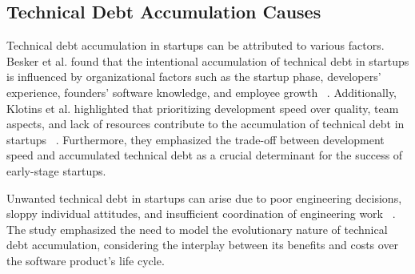 
\subsection{Technical Debt Accumulation Causes}
Technical debt accumulation in startups can be attributed to various factors. Besker et al. found that the intentional accumulation of technical debt in startups is influenced by organizational factors such as the startup phase, developers' experience, founders' software knowledge, and employee growth ~\cite{Besker2018}. Additionally, Klotins et al. highlighted that prioritizing development speed over quality, team aspects, and lack of resources contribute to the accumulation of technical debt in startups ~\cite{Klotins:2018:ETD}. Furthermore, they emphasized the trade-off between development speed and accumulated technical debt as a crucial determinant for the success of early-stage startups.

Unwanted technical debt in startups can arise due to poor engineering decisions, sloppy individual attitudes, and insufficient coordination of engineering work ~\cite{Klotins882019}. The study emphasized the need to model the evolutionary nature of technical debt accumulation, considering the interplay between its benefits and costs over the software product's life cycle.

